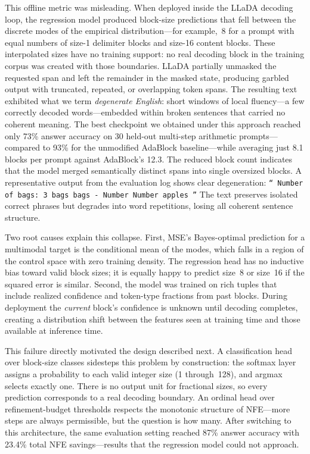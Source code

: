 \documentclass[11pt]{article}
\newcommand{\nfe}{NFE}
\begin{document}
This offline metric was misleading. When deployed inside the LLaDA decoding loop, the regression model produced block-size predictions that fell between the discrete modes of the empirical distribution---for example,~8 for a prompt with equal numbers of size-1 delimiter blocks and size-16 content blocks. These interpolated sizes have no training support: no real decoding block in the training corpus was created with those boundaries. LLaDA partially unmasked the requested span and left the remainder in the masked state, producing garbled output with truncated, repeated, or overlapping token spans. The resulting text exhibited what we term \emph{degenerate English}: short windows of local fluency---a few correctly decoded words---embedded within broken sentences that carried no coherent meaning. The best checkpoint we obtained under this approach reached only 73\% answer accuracy on 30 held-out multi-step arithmetic prompts---compared to 93\% for the unmodified AdaBlock baseline---while averaging just 8.1 blocks per prompt against AdaBlock's 12.3. The reduced block count indicates that the model merged semantically distinct spans into single oversized blocks. A representative output from the evaluation log shows clear degeneration:
\texttt{``
Number of bags: 3 bags bags - Number Number apples
''}
The text preserves isolated correct phrases but degrades into word repetitions, losing all coherent sentence structure.

Two root causes explain this collapse. First, MSE's Bayes-optimal prediction for a multimodal target is the conditional mean of the modes, which falls in a region of the control space with zero training density. The regression head has no inductive bias toward valid block sizes; it is equally happy to predict size~8 or size~16 if the squared error is similar. Second, the model was trained on rich tuples that include realized confidence and token-type fractions from past blocks. During deployment the \emph{current} block's confidence is unknown until decoding completes, creating a distribution shift between the features seen at training time and those available at inference time.

This failure directly motivated the design described next. A classification head over block-size classes sidesteps this problem by construction: the softmax layer assigns a probability to each valid integer size (1 through~128), and argmax selects exactly one. There is no output unit for fractional sizes, so every prediction corresponds to a real decoding boundary. An ordinal head over refinement-budget thresholds respects the monotonic structure of NFE---more steps are always permissible, but the question is how many. After switching to this architecture, the same evaluation setting reached 87\% answer accuracy with 23.4\% total \nfe{} savings---results that the regression model could not approach.
\end{document}
